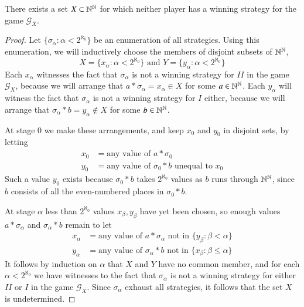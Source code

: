 \documentclass[12pt, a4paper, oneside, openright, titlepage]{book}
\begin{document}
\begin{thm}
    There exists a set $X \subset \mathbb N^{\mathbb N}$ for which neither player has a winning strategy for the game $\mathcal{G}_X$.
\end{thm}
\begin{proof}
    Let $\{\sigma_{\alpha}:\alpha < 2^{\aleph_0}\}$ be an enumeration of all strategies. Using this enumeration, we will inductively choose the members of disjoint subsets of $\mathbb N^{\mathbb N}$, \begin{equation*}
        X = \{x_{\alpha}:\alpha < 2^{\aleph_0}\}\text{  and  }Y = \{y_{\alpha}:\alpha < 2^{\aleph_0}\}
    \end{equation*}
    Each $x_{\alpha}$ witnesses the fact that $\sigma_{\alpha}$ is not a winning strategy for $II$ in the game $\mathcal{G}_X$, because we will arrange that $a*\sigma_{\alpha} = x_{\alpha} \in X$ for some $a \in \mathbb N^{\mathbb N}$. Each $y_{\alpha}$ will witness the fact that $\sigma_{\alpha}$ is not a winning strategy for $I$ either, because we will arrange that $\sigma_{\alpha}*b = y_{\alpha} \notin X$ for some $b \in \mathbb N^{\mathbb N}$.

    At stage $0$ we make these arrangements, and keep $x_0$ and $y_0$ in disjoint sets, by letting \begin{align*}
        x_0 &= \text{any value of }a*\sigma_0 \\
        y_0 &= \text{any value of }\sigma_0*b\text{ unequal to $x_0$}
    \end{align*}
    Such a value $y_0$ exists because $\sigma_0*b$ takes $2^{\aleph_0}$ values as $b$ runs through $\mathbb N^{\mathbb N}$, since $b$ consists of all the even-numbered places in $\sigma_0*b$.


    At stage $\alpha$ less than $2^{\aleph_0}$ values $x_{\beta},y_{\beta}$ have yet been chosen, so enough values $a*\sigma_{\alpha}$ and $\sigma_{\alpha}*b$ remain to let \begin{align*}
        x_{\alpha} &= \text{any value of }a*\sigma_{\alpha}\text{ not in }\{y_{\beta}:\beta < \alpha\} \\
        y_{\alpha} &= \text{any value of }\sigma_{\alpha}*b\text{ not in }\{x_{\beta}:\beta \leq \alpha\}
    \end{align*}
    It follows by induction on $\alpha$ that $X$ and $Y$ have no common member, and for each $\alpha < 2^{\aleph_0}$ we have witnesses to the fact that $\sigma_{\alpha}$ is not a winning strategy for either $II$ or $I$ in the game $\mathcal{G}_X$. Since $\sigma_{\alpha}$ exhaust all strategies, it follows that the set $X$ is undetermined.
\end{proof}
\end{document}
